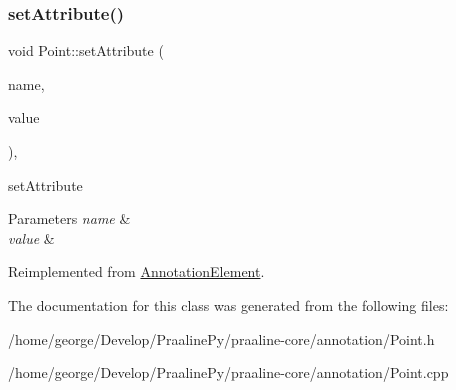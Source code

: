 \mbox{\label{class_point_a997cc0d524866e257f58ef9a3e82a432}} 
\subsubsection{\texorpdfstring{set\+Attribute()}{setAttribute()}}
{\footnotesize\ttfamily void Point\+::set\+Attribute (\begin{DoxyParamCaption}\item[{const Q\+String \&}]{name,  }\item[{Q\+Variant}]{value }\end{DoxyParamCaption})\hspace{0.3cm}{\ttfamily [override]}, {\ttfamily [virtual]}}



set\+Attribute 


\begin{DoxyParams}{Parameters}
{\em name} & \\
\hline
{\em value} & \\
\hline
\end{DoxyParams}


Reimplemented from \hyperlink{class_annotation_element_a206d8790fe92a7c8e6b703d026836584}{Annotation\+Element}.



The documentation for this class was generated from the following files\+:\begin{DoxyCompactItemize}
\item 
/home/george/\+Develop/\+Praaline\+Py/praaline-\/core/annotation/Point.\+h\item 
/home/george/\+Develop/\+Praaline\+Py/praaline-\/core/annotation/Point.\+cpp\end{DoxyCompactItemize}
